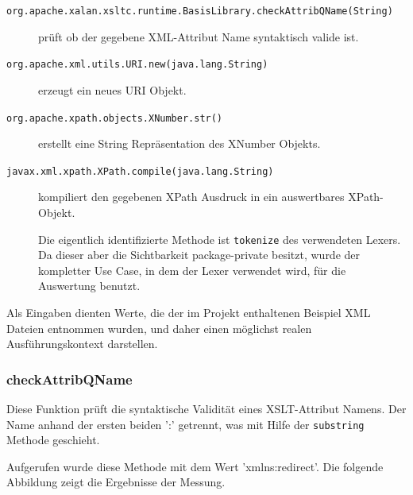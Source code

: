 \begin{description}
	\item [\texttt{org.apache.xalan.xsltc.runtime.BasisLibrary.checkAttribQName(String)}]
		prüft ob der gegebene XML-Attribut Name syntaktisch valide ist.
	\item [\texttt{org.apache.xml.utils.URI.new(java.lang.String)}]
		erzeugt ein neues URI Objekt. 
	\item [\texttt{org.apache.xpath.objects.XNumber.str()}]
		erstellt eine String Repräsentation des XNumber Objekts.
	\item [\texttt{javax.xml.xpath.XPath.compile(java.lang.String)}]
		kompiliert den gegebenen XPath Ausdruck in ein auswertbares XPath-Objekt.
		
		Die eigentlich identifizierte Methode ist \texttt{tokenize} des verwendeten 
		Lexers. Da dieser aber die Sichtbarkeit package-private
		besitzt, wurde der kompletter Use Case, in dem der Lexer verwendet wird, 
		für die Auswertung benutzt.
\end{description}

Als Eingaben dienten Werte, die der im Projekt enthaltenen Beispiel XML Dateien entnommen wurden, 
und daher einen möglichst realen Ausführungskontext darstellen.

\subsubsection{checkAttribQName}

Diese Funktion prüft die syntaktische Validität eines XSLT-Attribut Namens. Der Name anhand 
der ersten beiden ':' getrennt, was mit Hilfe der \texttt{substring} Methode geschieht. 

Aufgerufen wurde diese Methode mit dem Wert 'xmlns:redirect'. Die folgende Abbildung zeigt 
die Ergebnisse der Messung.

